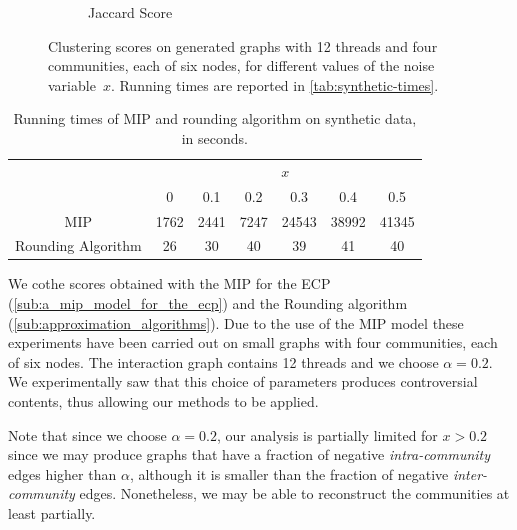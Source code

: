 \begin{figure}
\begin{center}
\begin{subfigure}[b]{0.8\textwidth}
			\caption{Jaccard Score}
			\label{fig:tex/out/synthetic_exact/_noise_jaccard.pdf}
		\end{subfigure}
	\end{center}
	\caption[MIP and rounding algorithm clustering scores on generated graphs]{Clustering scores on generated graphs with 12 threads and four communities, each
		of six nodes, for different values of the noise
		variable~$x$. Running times are reported in
		\autoref{tab:synthetic-times}.}
	\label{fig:clustering-mip-rounding}
\end{figure}

\begin{table}
	\centering
	\caption{Running times of \acrshort{MIP} and rounding algorithm on
		synthetic data, in seconds.}
	\label{tab:synthetic-times}
	\begin{tabular}{|c|cccccc|}
		\toprule
		                   & \multicolumn{6}{c|}{$x$}                                       \\
		                   & 0                        & 0.1  & 0.2  & 0.3   & 0.4   & 0.5   \\
		\midrule
		\acrshort{MIP}     & 1762                     & 2441 & 7247 & 24543 & 38992 & 41345 \\
		Rounding Algorithm & 26                       & 30   & 40   & 39    & 41    & 40    \\
		\bottomrule
	\end{tabular}
\end{table}

We cothe scores obtained with the \acrshort{MIP} for the \acrshort{ECP}
(\autoref{sub:a_mip_model_for_the_ecp}) and the Rounding algorithm
(\autoref{sub:approximation_algorithms}). Due to the use of the
\acrshort{MIP} model these experiments have been carried out on
small graphs with four communities, each of six nodes. The interaction graph
contains 12 threads and we choose $\alpha = 0.2$. We experimentally saw that
this choice of parameters produces controversial contents, thus allowing our
methods to be applied.

Note that since we choose $\alpha = 0.2$, our analysis is partially limited for
$x > 0.2$ since we may produce graphs that have a fraction of negative
\emph{intra-community} edges higher than $\alpha $, although it is smaller than
the fraction of negative \emph{inter-community} edges. Nonetheless, we may be
able to reconstruct the communities at least partially.

